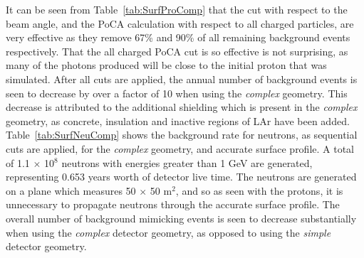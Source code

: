 It can be seen from Table~\ref{tab:SurfProComp} that the cut with respect to the beam angle, and the PoCA calculation with respect to all charged particles, are very effective as they remove 67\% and 90\% of all remaining background events respectively. That the all charged PoCA cut is so effective is not surprising, as many of the photons produced will be close to the initial proton that was simulated. After all cuts are applied, the annual number of background events is seen to decrease by over a factor of 10 when using the \emph{complex} geometry. This decrease is attributed to the additional shielding which is present in the \emph{complex} geometry, as concrete, insulation and inactive regions of LAr have been added. \\

Table~\ref{tab:SurfNeuComp} shows the background rate for neutrons, as sequential cuts are applied, for the \emph{complex} geometry, and accurate surface profile. A total of 1.1 $\times$ 10$^8$ neutrons with energies greater than 1 GeV are generated, representing 0.653 years worth of detector live time. The neutrons are generated on a plane which measures 50 $\times$ 50 m$^{2}$, and so as seen with the protons, it is unnecessary to propagate neutrons through the accurate surface profile. The overall number of background mimicking events is seen to decrease substantially when using the \emph{complex} detector geometry, as opposed to using the \emph{simple} detector geometry. \\


